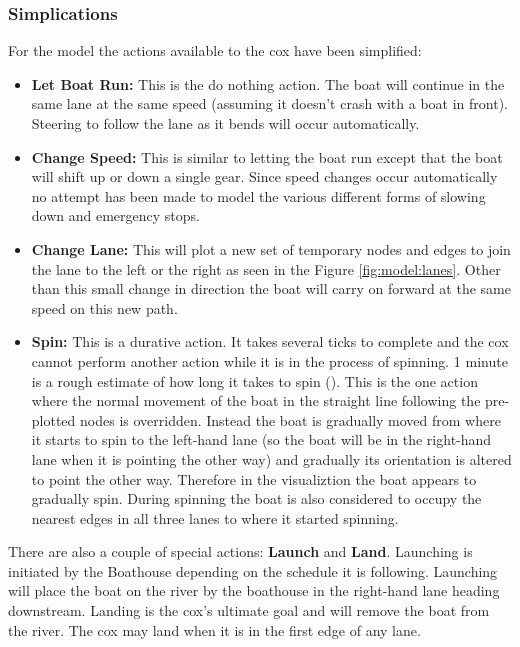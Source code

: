       \subsubsection{Simplications}
      For the model the actions available to the cox have been simplified:
      \begin{itemize}
        \item{\textbf{Let Boat Run:}} This is the do nothing action. The boat will continue in the same lane at the same speed (assuming it doesn't crash with a boat in front). Steering to follow the lane as it bends will occur automatically.
        \item{\textbf{Change Speed:}} This is similar to letting the boat run except that the boat will shift up or down a single gear. Since speed changes occur automatically no attempt has been made to model the various different forms of slowing down and emergency stops.
        \item{\textbf{Change Lane:}} This will plot a new set of temporary nodes and edges to join the lane to the left or the right as seen in the Figure \ref{fig:model:lanes}. Other than this small change in direction the boat will carry on forward at the same speed on this new path.
        \item{\textbf{Spin:}} This is a durative action. It takes several ticks to complete and the cox cannot perform another action while it is in the process of spinning. 1 minute is a rough estimate of how long it takes to spin (\cite{QCBC}). This is the one action where the normal movement of the boat in the straight line following the pre-plotted nodes  is overridden. Instead the boat is gradually moved from where it starts to spin to the left-hand lane (so the boat will be in the right-hand lane when it is pointing the other way) and gradually its orientation is altered to point the other way. Therefore in the visualiztion the boat appears to gradually spin. During spinning the boat is also considered to occupy the nearest edges in all three lanes to where it started spinning.
      \end{itemize}
      
      There are also a couple of special actions: \textbf{Launch} and \textbf{Land}. Launching is initiated by the Boathouse depending on the schedule it is following. Launching will place the boat on the river by the boathouse in the right-hand lane heading downstream. Landing is the cox's ultimate goal and will remove the boat from the river. The cox may land when it is in the first edge of any lane.
      

